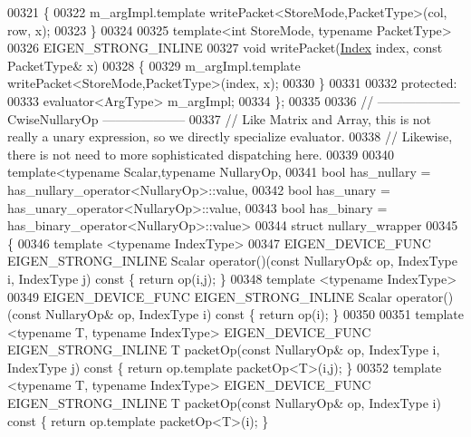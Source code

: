 \begin{DoxyCode}
00321   \{
00322     m\_argImpl.template writePacket<StoreMode,PacketType>(col, row, x);
00323   \}
00324 
00325   \textcolor{keyword}{template}<\textcolor{keywordtype}{int} StoreMode, \textcolor{keyword}{typename} PacketType>
00326   EIGEN\_STRONG\_INLINE
00327   \textcolor{keywordtype}{void} writePacket(\hyperlink{namespace_eigen_a62e77e0933482dafde8fe197d9a2cfde}{Index} index, \textcolor{keyword}{const} PacketType& x)
00328   \{
00329     m\_argImpl.template writePacket<StoreMode,PacketType>(index, x);
00330   \}
00331 
00332 \textcolor{keyword}{protected}:
00333   evaluator<ArgType> m\_argImpl;
00334 \};
00335 
00336 \textcolor{comment}{// -------------------- CwiseNullaryOp --------------------}
00337 \textcolor{comment}{// Like Matrix and Array, this is not really a unary expression, so we directly specialize evaluator.}
00338 \textcolor{comment}{// Likewise, there is not need to more sophisticated dispatching here.}
00339 
00340 \textcolor{keyword}{template}<\textcolor{keyword}{typename} Scalar,\textcolor{keyword}{typename} NullaryOp,
00341          \textcolor{keywordtype}{bool} has\_nullary = has\_nullary\_operator<NullaryOp>::value,
00342          \textcolor{keywordtype}{bool} has\_unary   = has\_unary\_operator<NullaryOp>::value,
00343          \textcolor{keywordtype}{bool} has\_binary  = has\_binary\_operator<NullaryOp>::value>
00344 \textcolor{keyword}{struct }nullary\_wrapper
00345 \{
00346   \textcolor{keyword}{template} <\textcolor{keyword}{typename} IndexType>
00347   EIGEN\_DEVICE\_FUNC EIGEN\_STRONG\_INLINE Scalar operator()(\textcolor{keyword}{const} NullaryOp& op, IndexType i, IndexType j)\textcolor{keyword}{
       const }\{ \textcolor{keywordflow}{return} op(i,j); \}
00348   \textcolor{keyword}{template} <\textcolor{keyword}{typename} IndexType>
00349   EIGEN\_DEVICE\_FUNC EIGEN\_STRONG\_INLINE Scalar operator()(\textcolor{keyword}{const} NullaryOp& op, IndexType i)\textcolor{keyword}{ const }\{ \textcolor{keywordflow}{return} 
      op(i); \}
00350 
00351   \textcolor{keyword}{template} <\textcolor{keyword}{typename} T, \textcolor{keyword}{typename} IndexType> EIGEN\_DEVICE\_FUNC EIGEN\_STRONG\_INLINE T packetOp(\textcolor{keyword}{const} 
      NullaryOp& op, IndexType i, IndexType j)\textcolor{keyword}{ const }\{ \textcolor{keywordflow}{return} op.template packetOp<T>(i,j); \}
00352   \textcolor{keyword}{template} <\textcolor{keyword}{typename} T, \textcolor{keyword}{typename} IndexType> EIGEN\_DEVICE\_FUNC EIGEN\_STRONG\_INLINE T packetOp(\textcolor{keyword}{const} 
      NullaryOp& op, IndexType i)\textcolor{keyword}{ const }\{ \textcolor{keywordflow}{return} op.template packetOp<T>(i); \}

\end{DoxyCode}
